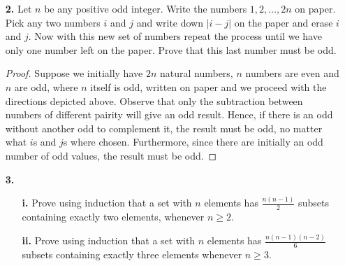 \documentclass[ 12pt ]{article}
\begin{document}
\begin{enumerate}
\begin{proof}
\begin{enumerate}
\begin{align*}
						3x_1 + y_1 &= 7 \\
						3x_2 + y_2 + y_1 &= 8 \\
						3x_3 + y_3 + y_2 + y_1 &= 8 \\
						&\vdots \\
						3x_7 + y_6 + y_5 &= 8 \\
						3x_8 + y_6 &= 8
					\end{align*}
					represents our particular board. Applying mod 3 to each equation we have
					\begin{align*}
						y_1 &\equiv 1\; (\mathrm{mod}\; 3) \\
						y_2 + y_1 &\equiv 2\; (\mathrm{mod}\; 3) \\
						y_3 + y_2 + y_1 &\equiv 2\; (\mathrm{mod}\; 3) \\
						&\vdots \\
						y_6 + y_5 &\equiv 2\; (\mathrm{mod}\; 3) \\
						y_6 &\equiv 2\; (\mathrm{mod}\; 3).
					\end{align*}
					By examining the first six equations we can conclude that $y_6 \equiv 0\; (\mathrm{mod}\; 3)$ which is a contradiction to equation eight.
			\end{enumerate}
		\end{proof}


	\item[\textbf{2.}] Let $n$ be any positive odd integer. Write the numbers $1, 2, \hdots, 2n$ on paper. Pick any two numbers $i$ and $j$ and write down $|i - j|$ on the paper and
		erase $i$ and $j$. Now with this new set of numbers repeat the process until we have only one number left on the paper. Prove that this last number must be odd.

		\begin{proof}
			Suppose we initially have $2n$ natural numbers, $n$ numbers are even and $n$ are odd, where $n$ itself is odd, written on paper and we proceed with the directions depicted
			above. Observe that only the subtraction between numbers of different pairity will give an odd result. Hence, if there is an odd without another odd to complement it,
			the result must be odd, no matter what $i$s and $j$s where chosen. Furthermore, since there are initially an odd number of odd values, the result must be odd.
		\end{proof}


	\item[\textbf{3.}]
		\begin{enumerate}
			\item[\textbf{i.}] Prove using induction that a set with $n$ elements has $\frac{n(n-1)}{2}$ subsets containing exactly two elements, whenever $n \geq 2$.
			\item[\textbf{ii.}] Prove using induction that a set with $n$ elements has $\frac{n(n-1)(n-2)}{6}$ subsets containing exactly three elements whenever $n \geq 3$.
		\end{enumerate}


\end{enumerate}
\end{document}
